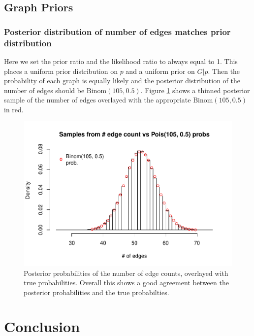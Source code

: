 \documentclass[11pt,a4paper]{article}
\numberwithin{equation}{section}
\begin{document}
\hypertarget{graph-priors}{%
\subsection{Graph Priors}\label{graph-priors}}

\hypertarget{posterior-distribution-of-number-of-edges-matches-prior-distribution}{%
\subsubsection{Posterior distribution of number of edges matches prior
distribution}\label{posterior-distribution-of-number-of-edges-matches-prior-distribution}}

Here we set the prior ratio and the likelihood ratio to always equal to
1. This places a uniform prior distribution on \(p\) and a uniform prior
on \(G|p\). Then the probability of each graph is equally likely and the
posterior distribution of the number of edges should be
\(\text{Binom}(105, 0.5)\). Figure \ref{fig:binom_hist} shows a thinned
posterior sample of the number of edges overlayed with the appropriate
\(\text{Binom}(105, 0.5)\) in red.

\begin{figure}
\centering
\includegraphics{thesis_draft_files/figure-latex/unnamed-chunk-9-1.pdf}
\caption{\label{fig:binom_hist} Posterior probabilities of the number of
edge counts, overlayed with true probabilities. Overall this shows a
good agreement between the posterior probabilities and the true
probabilties.}
\end{figure}

\pagebreak

\hypertarget{conclusion}{%
\section{Conclusion}\label{conclusion}}
\end{document}
